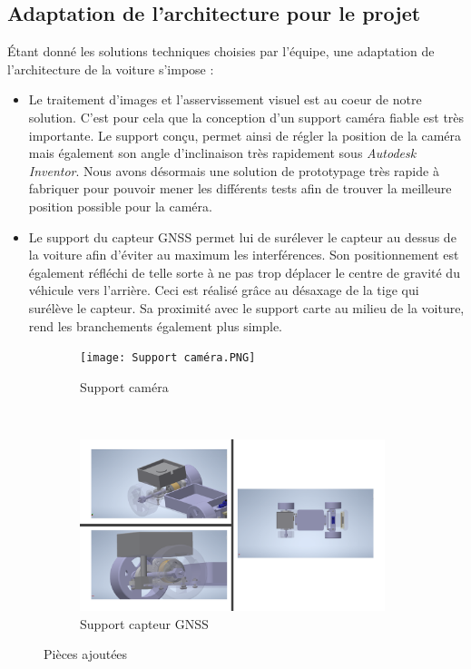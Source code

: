 \documentclass[12pt, openany]{report}
\begin{document}
\subsection{Adaptation de l'architecture pour le projet}
Étant donné les solutions techniques choisies par l'équipe, une adaptation de l'architecture de la voiture s'impose :
\begin{itemize}[label=\textbullet, font=\small]
    \item Le traitement d'images et l'asservissement visuel est au coeur de notre solution. C'est pour cela que la conception d'un support caméra fiable est très importante. Le support conçu, permet ainsi de régler la position de la caméra mais également son angle d'inclinaison très rapidement sous \textit{Autodesk Inventor}. Nous avons désormais une solution de prototypage très rapide à fabriquer pour pouvoir mener les différents tests afin de trouver la meilleure position possible pour la caméra.
    \item Le support du capteur \textsc{GNSS} permet lui de surélever le capteur au dessus de la voiture afin d'éviter au maximum les interférences. Son positionnement est également réfléchi de telle sorte à ne pas trop déplacer le centre de gravité du véhicule vers l'arrière. Ceci est réalisé grâce au désaxage de la tige qui surélève le capteur. Sa proximité avec le support carte au milieu de la voiture, rend les branchements également plus simple.\\
\end{itemize}

\begin{figure}[H]
     \centering
     \begin{subfigure}[b]{0.45\textwidth}
         \centering
         \texttt{[image: Support caméra.PNG]}
         \caption{Support caméra}
     \end{subfigure}
     ~
     \begin{subfigure}[b]{0.45\textwidth}
         \centering
         \includegraphics[width=\textwidth, height = 5cm]{Support GPS.PNG}
         \caption{Support capteur \textsc{GNSS}}
     \end{subfigure}
     \caption{Pièces ajoutées}
     \label{fig:piece_aj}
\end{figure}
\end{document}

